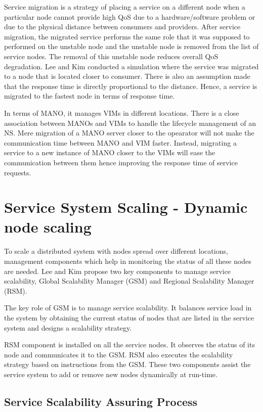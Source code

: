 Service migration is a strategy of placing a service on a different node when a particular node cannot provide high QoS due to a hardware/software problem or due to the physical distance between consumers and providers. After service migration, the migrated service performs the same role that it was supposed to performed on the unstable node and the unstable node is removed from the list of service nodes.
The removal of this unstable node reduces overall QoS degradation.
Lee and Kim \cite{lee_software_2010} conducted a simulation where the service was migrated to a node that is located closer to consumer. There is also an assumption made that the response time is directly proportional to the distance. Hence, a service is migrated to the fastest node in terms of response time.

In terms of MANO, it manages VIMs in different locations. There is a close association between MANOs and VIMs to handle the lifecycle management of an NS.
Mere migration of a MANO server closer to the opearator will not make the communication time between MANO and VIM faster. Instead, migrating a service to a new instance of MANO closer to the VIMs will ease the communication between them hence improving the response time of service requests.

\section{Service System Scaling - Dynamic node scaling}

To scale a distributed system with nodes spread over different locations, management components which help in monitoring the status of all these nodes are needed. Lee and Kim \cite{lee_software_2010} propose two key components to manage service scalability, Global Scalability Manager (GSM) and Regional Scalability Manager (RSM).

The key role of GSM is to manage service scalability. It balances service load in the system by obtaining the current status of nodes that are listed in the service system and designs a scalability strategy.

RSM component is installed on all the service nodes. It observes the status of its node and communicates it to the GSM. RSM also executes the scalability strategy based on instructions from the GSM. These two components assist the service system to add or remove new nodes dynamically at run-time.

\subsection{Service Scalability Assuring Process}


